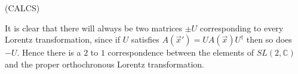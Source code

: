 (CALCS)

It is clear that there will always be two matrices $\pm U$ corresponding to every Lorentz transformation, since if $U$ satisfies $A(\vec{x}') = U A(\vec{x}) U^{\dagger}$ then so does $-U$. Hence there is a $2$ to $1$ correspondence between the elements of $SL(2,\mathbb{C})$ and the proper orthochronous Lorentz transformation.
